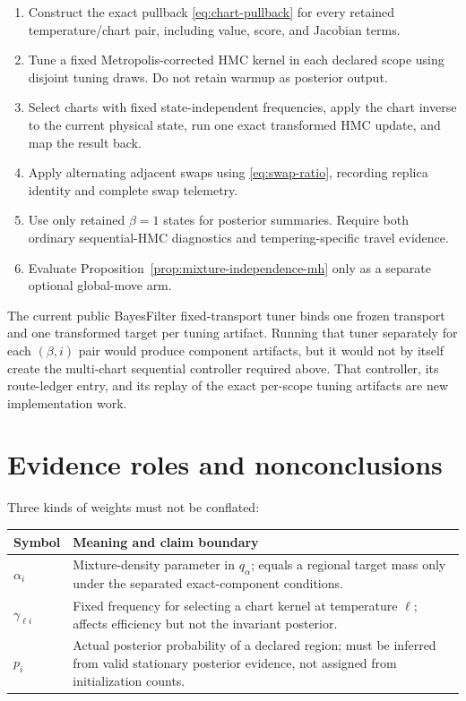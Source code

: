 \documentclass[11pt]{article}
\theoremstyle{definition}
\theoremstyle{remark}
\newcommand{\1}{\mathbf{1}}
\begin{document}
\begin{enumerate}
 \item Construct the exact pullback \eqref{eq:chart-pullback} for every retained
 temperature/chart pair, including value, score, and Jacobian terms.
 \item Tune a fixed Metropolis-corrected HMC kernel in each declared scope using
 disjoint tuning draws.  Do not retain warmup as posterior output.
 \item Select charts with fixed state-independent frequencies, apply the chart
 inverse to the current physical state, run one exact transformed HMC update,
 and map the result back.
 \item Apply alternating adjacent swaps using \eqref{eq:swap-ratio}, recording
 replica identity and complete swap telemetry.
 \item Use only retained $\beta=1$ states for posterior summaries.  Require both
 ordinary sequential-HMC diagnostics and tempering-specific travel evidence.
 \item Evaluate Proposition~\ref{prop:mixture-independence-mh} only as a separate
 optional global-move arm.
\end{enumerate}

The current public BayesFilter fixed-transport tuner binds one frozen transport
and one transformed target per tuning artifact.  Running that tuner separately
for each $(\beta,i)$ pair would produce component artifacts, but it would not by
itself create the multi-chart sequential controller required above.  That
controller, its route-ledger entry, and its replay of the exact per-scope tuning
artifacts are new implementation work.

\section{Evidence roles and nonconclusions}

Three kinds of weights must not be conflated:
\begin{center}
\begin{tabularx}{\textwidth}{@{}lX@{}}
\toprule
Symbol & Meaning and claim boundary \\
\midrule
$\alpha_i$ & Mixture-density parameter in $q_\alpha$; equals a regional target
mass only under the separated exact-component conditions. \\
$\gamma_{\ell i}$ & Fixed frequency for selecting a chart kernel at temperature
$\ell$; affects efficiency but not the invariant posterior. \\
$p_i$ & Actual posterior probability of a declared region; must be inferred
from valid stationary posterior evidence, not assigned from initialization
counts. \\
\bottomrule
\end{tabularx}
\end{center}
\end{document}
